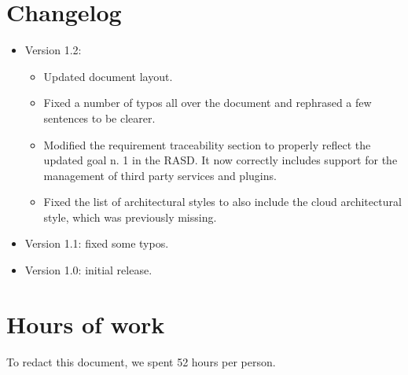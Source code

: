 \begin{appendices}

\chapter{Changelog}
\begin{itemize}
	\item Version 1.2:
	\begin{itemize}
		\item Updated document layout.
		\item Fixed a number of typos all over the document and rephrased a few sentences to be clearer. 
		\item Modified the requirement traceability section to properly reflect the updated goal n. 1 in the RASD. It now correctly includes support for the management of third party services and plugins.
		\item Fixed the list of architectural styles to also include the cloud architectural style, which was previously missing.
	\end{itemize}
	\item Version 1.1: fixed some typos.
	\item Version 1.0: initial release.
\end{itemize}

\chapter{Hours of work}
To redact this document, we spent 52 hours per person.



\end{appendices}